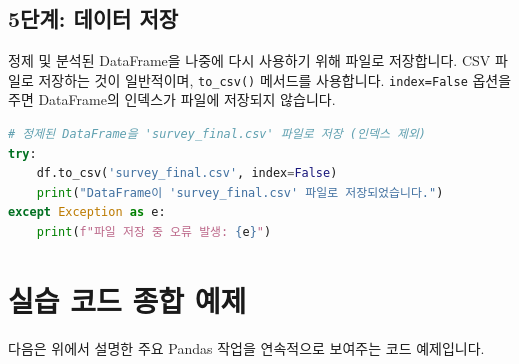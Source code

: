 \documentclass[11pt,a4paper]{book}
\theoremstyle{definition}
\begin{document}
\subsection{5단계: 데이터 저장}

정제 및 분석된 DataFrame을 나중에 다시 사용하기 위해 파일로 저장합니다. CSV 파일로 저장하는 것이 일반적이며, \texttt{to\_csv()} 메서드를 사용합니다. \texttt{index=False} 옵션을 주면 DataFrame의 인덱스가 파일에 저장되지 않습니다.

\begin{codeexamplebox}
\begin{lstlisting}[language=Python, caption={DataFrame을 CSV 파일로 저장}, label={lst:to_csv}, breaklines=true]
# 정제된 DataFrame을 'survey_final.csv' 파일로 저장 (인덱스 제외)
try:
    df.to_csv('survey_final.csv', index=False)
    print("DataFrame이 'survey_final.csv' 파일로 저장되었습니다.")
except Exception as e:
    print(f"파일 저장 중 오류 발생: {e}")
\end{lstlisting}
\end{codeexamplebox}


\section{실습 코드 종합 예제}

다음은 위에서 설명한 주요 Pandas 작업을 연속적으로 보여주는 코드 예제입니다.
\end{document}

